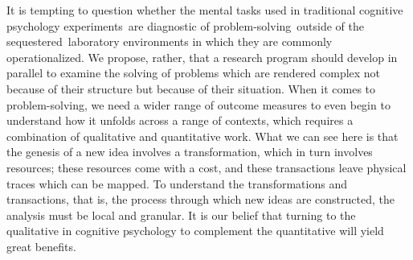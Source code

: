 \documentclass[twocolumn, issue, empirical, authordate,drafn]{jote-new-article}
\begin{document}
It is tempting to question whether the mental tasks used in traditional cognitive psychology experiments~are diagnostic of problem-solving~outside of the sequestered~laboratory environments in which they are commonly operationalized. We propose, rather, that a research program should develop in parallel to examine the solving of problems which are rendered complex not because of their structure but because of their situation. When it comes to problem-solving, we need a wider range of outcome measures to even begin to understand how it unfolds across a range of contexts, which requires a combination of qualitative and quantitative work. What we can see here is that the genesis of a new idea involves a transformation, which in turn involves resources; these resources come with a cost, and these transactions leave physical traces which can be mapped. To understand the transformations and transactions, that is, the process through which new ideas are constructed, the analysis must be local and granular. It is our belief that turning to the qualitative in cognitive psychology to complement the quantitative will yield great benefits. 

\printbibliography
\end{document}
